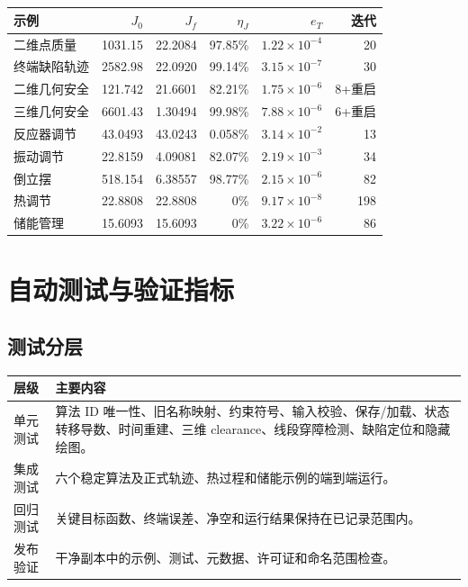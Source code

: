 \documentclass[UTF8,zihao=-4,openany,fontset=fandol]{ctexbook}
\begin{document}
{\small
\begin{longtable}{p{}rrrrr}
\toprule
示例 & $J_0$ & $J_f$ & $\eta_J$ & $e_T$ & 迭代\\
\midrule
\endhead
二维点质量 & 1031.15 & 22.2084 & 97.85\% & $1.22{\times}10^{-4}$ & 20\\
终端缺陷轨迹 & 2582.98 & 22.0920 & 99.14\% & $3.15{\times}10^{-7}$ & 30\\
二维几何安全 & 121.742 & 21.6601 & 82.21\% & $1.75{\times}10^{-6}$ & 8+重启\\
三维几何安全 & 6601.43 & 1.30494 & 99.98\% & $7.88{\times}10^{-6}$ & 6+重启\\
反应器调节 & 43.0493 & 43.0243 & 0.058\% & $3.14{\times}10^{-2}$ & 13\\
振动调节 & 22.8159 & 4.09081 & 82.07\% & $2.19{\times}10^{-3}$ & 34\\
倒立摆 & 518.154 & 6.38557 & 98.77\% & $2.15{\times}10^{-6}$ & 82\\
热调节 & 22.8808 & 22.8808 & 0\% & $9.17{\times}10^{-8}$ & 198\\
储能管理 & 15.6093 & 15.6093 & 0\% & $3.22{\times}10^{-6}$ & 86\\
\bottomrule
\end{longtable}
}



\chapter{自动测试与验证指标}

\section{测试分层}

\begin{longtable}{p{}p{}}
\toprule
层级 & 主要内容\\
\midrule
\endhead
单元测试 &
算法 ID 唯一性、旧名称映射、约束符号、输入校验、保存/加载、状态转移导数、时间重建、三维 clearance、线段穿障检测、缺陷定位和隐藏绘图。\\
集成测试 &
六个稳定算法及正式轨迹、热过程和储能示例的端到端运行。\\
回归测试 &
关键目标函数、终端误差、净空和运行结果保持在已记录范围内。\\
发布验证 &
干净副本中的示例、测试、元数据、许可证和命名范围检查。\\
\bottomrule
\end{longtable}
\end{document}
